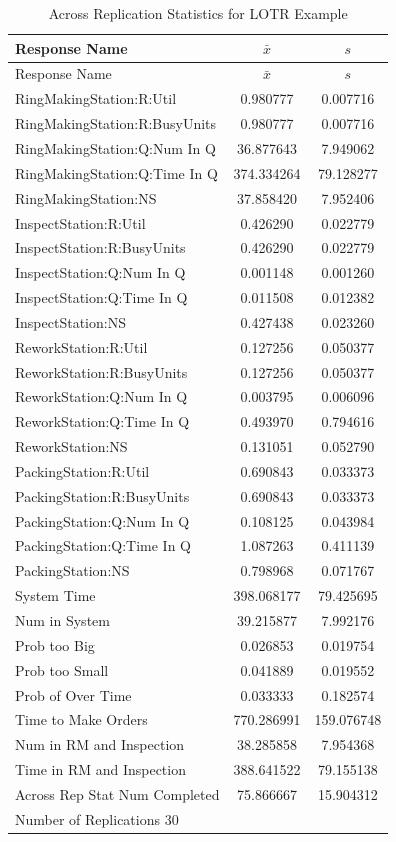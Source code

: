 \documentclass[
]{book}
\theoremstyle{definition}
\theoremstyle{definition}
\theoremstyle{definition}
\theoremstyle{definition}
\theoremstyle{remark}
\begin{document}
\begin{longtable}[]{@{}lcc@{}}
\caption{Across Replication Statistics for LOTR Example}\tabularnewline
\toprule
Response Name & \(\bar{x}\) & \(s\) \\
\midrule
\endfirsthead
\toprule
Response Name & \(\bar{x}\) & \(s\) \\
\midrule
\endhead
RingMakingStation:R:Util & 0.980777 & 0.007716 \\
RingMakingStation:R:BusyUnits & 0.980777 & 0.007716 \\
RingMakingStation:Q:Num In Q & 36.877643 & 7.949062 \\
RingMakingStation:Q:Time In Q & 374.334264 & 79.128277 \\
RingMakingStation:NS & 37.858420 & 7.952406 \\
InspectStation:R:Util & 0.426290 & 0.022779 \\
InspectStation:R:BusyUnits & 0.426290 & 0.022779 \\
InspectStation:Q:Num In Q & 0.001148 & 0.001260 \\
InspectStation:Q:Time In Q & 0.011508 & 0.012382 \\
InspectStation:NS & 0.427438 & 0.023260 \\
ReworkStation:R:Util & 0.127256 & 0.050377 \\
ReworkStation:R:BusyUnits & 0.127256 & 0.050377 \\
ReworkStation:Q:Num In Q & 0.003795 & 0.006096 \\
ReworkStation:Q:Time In Q & 0.493970 & 0.794616 \\
ReworkStation:NS & 0.131051 & 0.052790 \\
PackingStation:R:Util & 0.690843 & 0.033373 \\
PackingStation:R:BusyUnits & 0.690843 & 0.033373 \\
PackingStation:Q:Num In Q & 0.108125 & 0.043984 \\
PackingStation:Q:Time In Q & 1.087263 & 0.411139 \\
PackingStation:NS & 0.798968 & 0.071767 \\
System Time & 398.068177 & 79.425695 \\
Num in System & 39.215877 & 7.992176 \\
Prob too Big & 0.026853 & 0.019754 \\
Prob too Small & 0.041889 & 0.019552 \\
Prob of Over Time & 0.033333 & 0.182574 \\
Time to Make Orders & 770.286991 & 159.076748 \\
Num in RM and Inspection & 38.285858 & 7.954368 \\
Time in RM and Inspection & 388.641522 & 79.155138 \\
Across Rep Stat Num Completed & 75.866667 & 15.904312 \\
Number of Replications 30 & & \\
\bottomrule
\end{longtable}
\end{document}
